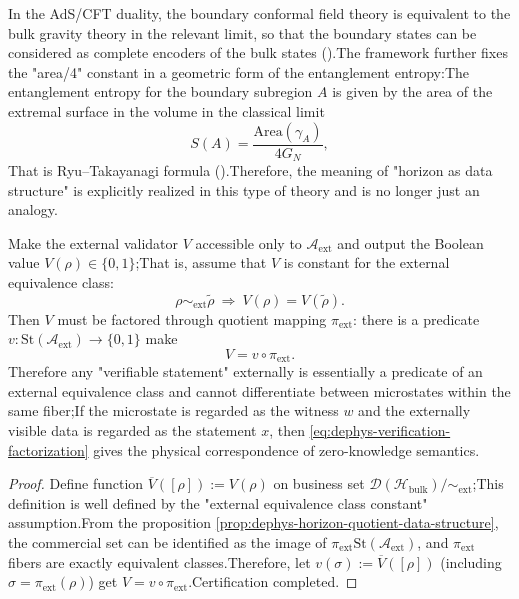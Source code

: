 \begin{remark}\label{rem:dephys-adscft-explicit-encoder}In the AdS/CFT duality, the boundary conformal field theory is equivalent to the bulk gravity theory in the relevant limit, so that the boundary states can be considered as complete encoders of the bulk states (\cite{Maldacena1999LargeN}).The framework further fixes the "area/4" constant in a geometric form of the entanglement entropy:The entanglement entropy for the boundary subregion \(A\) is given by the area of ​​the extremal surface in the volume in the classical limit\[
S(A)=\frac{\mathrm{Area}(\gamma_A)}{4G_N},
\]
That is Ryu--Takayanagi formula (\cite{RyuTakayanagi2006HolographicEntanglementEntropy}).Therefore, the meaning of "horizon as data structure" is explicitly realized in this type of theory and is no longer just an analogy.\end{remark}

\begin{proposition}\label{prop:dephys-zero-knowledge-quotient-factorization}Make the external validator \(V\) accessible only to \(\mathcal{A}_{\mathrm{ext}}\) and output the Boolean value \(V(\rho)\in\{0,1\}\);That is, assume that \(V\) is constant for the external equivalence class:\[
\rho\sim_{\mathrm{ext}}\tilde\rho\ \Longrightarrow\ V(\rho)=V(\tilde\rho).
\]
Then \(V\) must be factored through quotient mapping \(\pi_{\mathrm{ext}}\): there is a predicate\(
v:\mathrm{St}(\mathcal{A}_{\mathrm{ext}})\to\{0,1\}
\)
make\begin{equation}\label{eq:dephys-verification-factorization}
\boxed{\;
V=v\circ \pi_{\mathrm{ext}}.\;}
\end{equation}
Therefore any "verifiable statement" externally is essentially a predicate of an external equivalence class and cannot differentiate between microstates within the same fiber;If the microstate is regarded as the witness \(w\) and the externally visible data is regarded as the statement \(x\), then \eqref{eq:dephys-verification-factorization} gives the physical correspondence of zero-knowledge semantics.\end{proposition}

\begin{proof}
Define function \(\overline V([\rho]) := V(\rho)\) on business set \(\mathcal{D}(\mathcal{H}_{\mathrm{bulk}})/{\sim_{\mathrm{ext}}}\);This definition is well defined by the "external equivalence class constant" assumption.From the proposition \ref{prop:dephys-horizon-quotient-data-structure}, the commercial set can be identified as the image of \(\pi_{\mathrm{ext}}\)\(\mathrm{St}(\mathcal{A}_{\mathrm{ext}})\), and \(\pi_{\mathrm{ext}}\) fibers are exactly equivalent classes.Therefore, let \(v(\sigma):=\overline V([\rho])\) (including \(\sigma=\pi_{\mathrm{ext}}(\rho)\)) get \(V=v\circ\pi_{\mathrm{ext}}\).Certification completed.\end{proof}


